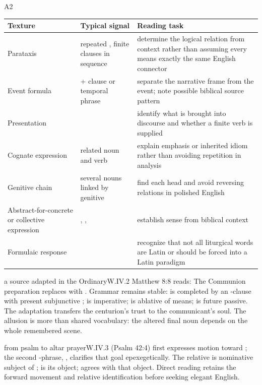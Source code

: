 \begin{courseunit}{A2}
\begin{xltabular}{\linewidth}{@{}P{1.45in}P{2.05in}Y@{}}
  \toprule
  \textbf{Texture} & \textbf{Typical signal} & \textbf{Reading task} \\
  \midrule\endhead
  Parataxis & repeated , finite clauses in sequence & determine the
       logical relation from context rather than assuming every 
       means exactly the same English connector \\
  Event formula &  + clause or temporal phrase & separate the
       narrative frame from the event; note possible biblical source pattern \\
  Presentation &  & identify what is brought into discourse and
       whether a finite verb is supplied \\
  Cognate expression & related noun and verb & explain emphasis or inherited
       idiom rather than avoiding repetition in analysis \\
  Genitive chain & several nouns linked by genitive & find each head and avoid
       reversing relations in polished English \\
  Abstract-for-concrete or collective expression & ,
       ,  & establish sense from biblical context \\
  Formulaic response &  & recognize that not all
       liturgical words are Latin or should be forced into a Latin paradigm \\
  \bottomrule
\end{xltabular}

\begin{workedexample}{a source adapted in the Ordinary}{W.IV.2}
Matthew 8:8 reads:  The Communion preparation replaces
 with . Grammar remains stable: 
is completed by an -clause with present subjunctive ;
 is imperative;  is ablative of means;
 is future passive. The adaptation transfers the centurion's
trust to the communicant's soul. The allusion is more than shared vocabulary:
the altered final noun depends on the whole remembered scene.
\end{workedexample}

\begin{workedexample}{from psalm to altar prayer}{W.IV.3}
(Psalm 42:4) first expresses motion toward ; the second
-phrase, , clarifies that goal epexegetically. The
relative  is nominative subject of
;  is its object;  agrees with
that object. Direct reading retains the forward movement and relative
identification before seeking elegant English.
\end{workedexample}


\end{courseunit}
